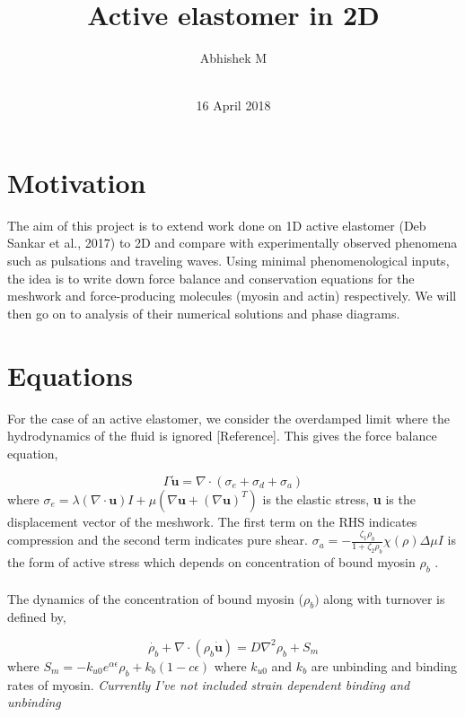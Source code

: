 \documentclass[12pt]{article}
\title{\textbf{Active elastomer in 2D}}
\author{Abhishek M\\
		\\
		}
\date{16 April 2018}
\begin{document}
\maketitle

\section{Motivation}

The aim of this project is to extend work done on 1D active elastomer (Deb Sankar et al., 2017) to 2D and compare with experimentally observed phenomena such as pulsations and traveling waves. Using minimal phenomenological inputs, the idea is to write down force balance and conservation equations for the meshwork and force-producing molecules (myosin and actin) respectively. We will then go on to analysis of their numerical solutions and phase diagrams. 

\section{Equations}
For the case of an active elastomer, we consider the overdamped limit where the hydrodynamics of the fluid is ignored [Reference]. This gives the force balance equation,

\begin{equation}
\Gamma \dot{\textbf{u}} = \nabla \cdot (\sigma_e + \sigma_d + \sigma_a)
\end{equation} 
where $\sigma_e = \lambda(\nabla \cdot \textbf{u})I + \mu(\nabla \textbf{u} + (\nabla \textbf{u})^T) $ is the elastic stress, \textbf{u} is the displacement vector of the meshwork. The first term on the RHS indicates compression and the second term indicates pure shear. 
$\sigma_a = - \frac{\zeta_1 \rho_b }{1+\zeta_2\rho_b} \chi(\rho)\Delta\mu I$ is the form of active stress which depends on concentration of bound myosin $\rho_b$ . 
\\
\\
The dynamics of the concentration of bound myosin ($\rho_b)$ along with turnover is defined by,
 
\begin{equation} \dot{\rho_b} + \nabla \cdot(\rho_b \dot{\textbf{u}}) = D\nabla^2\rho_b + S_m \end{equation}
where $S_m = -k_{u0} e^{\alpha \epsilon}\rho_b  + k_b(1-c\epsilon) $ where $k_{u0}$ and $k_b$ are unbinding and binding rates of myosin. \emph{Currently I've not included strain dependent binding and unbinding}
\end{document}
